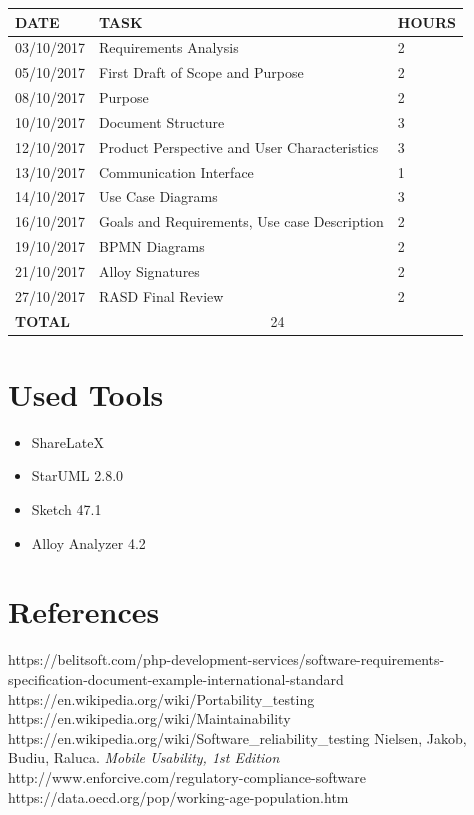 \documentclass[12pt]{article}
\begin{document}
\begin{center}
\begin{tabular}{ |p{}|p{}|p{}| } 
 \hline
 \textbf{DATE} & \textbf{TASK} & \textbf{HOURS} \\ 
  \hline
 03/10/2017 & Requirements Analysis & 2 \\ 
 \hline
 05/10/2017 & First Draft of Scope and Purpose & 2 \\
 \hline
 08/10/2017 & Purpose & 2 \\
 \hline
 10/10/2017 & Document Structure & 3 \\
 \hline
 12/10/2017 & Product Perspective and User Characteristics & 3 \\
 \hline
 13/10/2017 & Communication Interface & 1 \\
 \hline
 14/10/2017 & Use Case Diagrams & 3 \\
 \hline
 16/10/2017 & Goals and Requirements, Use case Description & 2 \\
 \hline
 19/10/2017 & BPMN Diagrams & 2 \\
 \hline
 21/10/2017 & Alloy Signatures & 2 \\
 \hline
 27/10/2017 & RASD Final Review & 2 \\
  \hline
  \textbf{TOTAL} & \multicolumn{2}{c|}{24} \\ 
  \hline
\end{tabular}
\end{center}

\section{Used Tools}
\begin{itemize}
    \item ShareLateX
    \item StarUML 2.8.0
    \item Sketch 47.1
    \item Alloy Analyzer 4.2
\end{itemize}

\section{References}

\begin{thebibliography}{9}
https://belitsoft.com/php-development-services/software-requirements-specification-document-example-international-standard
https://en.wikipedia.org/wiki/Portability\_testing
https://en.wikipedia.org/wiki/Maintainability
https://en.wikipedia.org/wiki/Software\_reliability\_testing
Nielsen, Jakob, Budiu, Raluca. \textit{Mobile Usability, 1st Edition}
http://www.enforcive.com/regulatory-compliance-software
https://data.oecd.org/pop/working-age-population.htm

\end{thebibliography}
\end{document}
